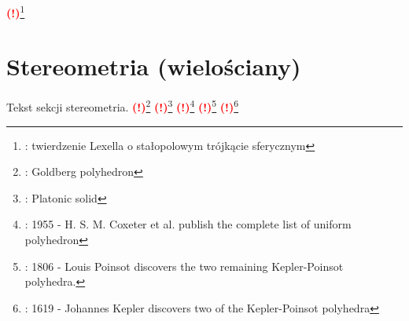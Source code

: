 \documentclass{greaseproof}
\newcommand{\todofoot}[1]{\textcolor{red}{\textbf{(!)}\footnote{\textbf{\color{red}{Do zrobienia}}: #1}}}
\begin{document}
\todofoot{twierdzenie Lexella o stałopolowym trójkącie sferycznym}

\chapter{Stereometria (wielościany)}
Tekst sekcji stereometria.
\todofoot{Goldberg polyhedron} %
\todofoot{Platonic solid} %
\todofoot{1955 - H. S. M. Coxeter et al. publish the complete list of uniform polyhedron}
\todofoot{1806 - Louis Poinsot discovers the two remaining Kepler-Poinsot polyhedra.}
\todofoot{1619 - Johannes Kepler discovers two of the Kepler-Poinsot polyhedra}
\end{document}
